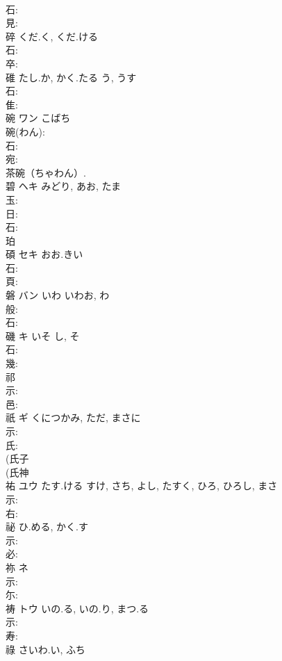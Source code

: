 \documentclass[8pt]{extreport}
\begin{document}
\begin{CJK}{UTF8}{min}
\\	石: 
\\	見: 
\\	碎		くだ.く, くだ.ける				
\\	石: 
\\	卒: 
\\	碓		たし.か, かく.たる	う, うす			
\\	石: 
\\	隹: 
\\	碗	ワン	こばち		
\\	碗(わん): 
\\	石: 
\\	宛: 
\\	茶碗（ちゃわん）. 
\\	碧	ヘキ		みどり, あお, たま	
\\	玉: 
\\	日: 
\\	石: 
\\	珀 
\\	碩	セキ	おお.きい		
\\	石: 
\\	頁: 
\\	磐	バン	いわ	いわお, わ	
\\	般: 
\\	石: 
\\	磯	キ	いそ	し, そ	
\\	石: 
\\	幾: 
\\	祁						
\\	示: 
\\	邑: 
\\	祇	ギ	くにつかみ, ただ, まさに		
\\	示: 
\\	氏: 
\\	(氏子 
\\	(氏神 
\\	祐	ユウ	たす.ける	すけ, さち, よし, たすく, ひろ, ひろし, まさ	
\\	示: 
\\	右: 
\\	祕		ひ.める, かく.す				
\\	示: 
\\	必: 
\\	祢	ネ			
\\	示: 
\\	尓: 
\\	祷	トウ	いの.る, いの.り, まつ.る		
\\	示: 
\\	寿: 
\\	祿		さいわ.い, ふち				

\end{CJK}
\end{document}
